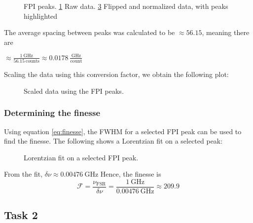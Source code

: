 \documentclass{article}
\begin{document}
\begin{figure}[h]
	\centering
	\begin{subfigure}[t]{0.45\textwidth}
		\centering
		\scalebox{0.5}{}
		\caption{}
		\label{fig:peaks}
	\end{subfigure}
	\begin{subfigure}[t]{0.45\textwidth}
		\centering
		\scalebox{0.5}{}
		\caption{}
		\label{fig:normalized_peaks}
	\end{subfigure}
	\caption{FPI peaks. \ref{fig:peaks} Raw data. \ref{fig:normalized_peaks} Flipped and normalized data, with peaks highlighted}
\end{figure}

The average spacing between peaks was calculated to be $\approx 56.15$, meaning there are

$\approx \frac{1 \ \text{GHz}}{56.15 \ \text{counts}} \approx 0.0178 \ \frac{\text{GHz}}{\text{count}}$ 

Scaling the data using this conversion factor, we obtain the following plot:

\begin{figure}[h]
	\centering
	
	\caption{Scaled data using the FPI peaks.}
	\label{fig:scaled_data}
\end{figure}

\pagebreak{}

\subsubsection{Determining the finesse}

Using equation \ref{eq:finesse}, the FWHM for a selected FPI peak can be used to find the finesse. The following shows a Lorentzian fit on a selected peak:

\begin{figure}[h]
	\centering
	
	\caption{Lorentzian fit on a selected FPI peak.}
	\label{fig:lorentzian_fit}
\end{figure}

From the fit, $\delta \nu \approx 0.00476 \ \text{GHz}$ Hence, the finesse is \[ \mathscr{F} = \frac{\nu_{\text{FSR}}}{\delta \nu} = \frac{1 \ \text{GHz}}{0.00476 \ \text{GHz}} \approx 209.9\]

\pagebreak{}

\subsection{Task 2}
\end{document}

